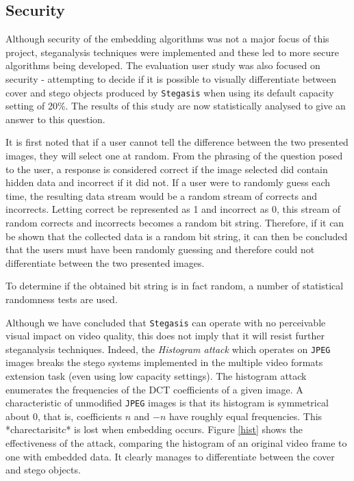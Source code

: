 \documentclass[paper=a4, fontsize=11pt,twoside]{scrartcl}    %
\numberwithin{table}{section}
\numberwithin{figure}{section}
\numberwithin{algorithm}{section}
\begin{document}
\subsection{Security}
\label{security}

Although security of the embedding algorithms was not a major focus of this project, steganalysis techniques were implemented and these led to more secure algorithms being developed. The evaluation user study was also focused on security - attempting to decide if it is possible to visually differentiate between cover and stego objects produced by \texttt{Stegasis} when using its default capacity setting of 20\%. The results of this study are now statistically analysed to give an answer to this question.

It is first noted that if a user cannot tell the difference between the two presented images, they will select one at random. From the phrasing of the question posed to the user, a response is considered correct if the image selected did contain hidden data and incorrect if it did not. If a user were to randomly guess each time, the resulting data stream would be a random stream of corrects and incorrects. Letting correct be represented as 1 and incorrect as 0, this stream of random corrects and incorrects becomes a random bit string. Therefore, if it can be shown that the collected data is a random bit string, it can then be concluded that the users must have been randomly guessing and therefore could not differentiate between the two presented images.

To determine if the obtained bit string is in fact random, a number of statistical randomness tests are used.

Although we have concluded that \texttt{Stegasis} can operate with no perceivable visual impact on video quality, this does not imply that it will resist further steganalysis techniques. Indeed, the \textit{Histogram attack} which operates on \texttt{JPEG} images breaks the stego systems implemented in the multiple video formats extension task (even using low capacity settings). The histogram attack enumerates the frequencies of the DCT coefficients of a given image. A characteristic of unmodified \texttt{JPEG} images is that its histogram is symmetrical about 0, that is, coefficients $n$ and $-n$ have roughly equal frequencies. This *charectarisitc* is lost when embedding occurs. Figure \ref{hist} shows the effectiveness of the attack, comparing the histogram of an original video frame to one with embedded data. It clearly manages to differentiate between the cover and stego objects.
\end{document}
